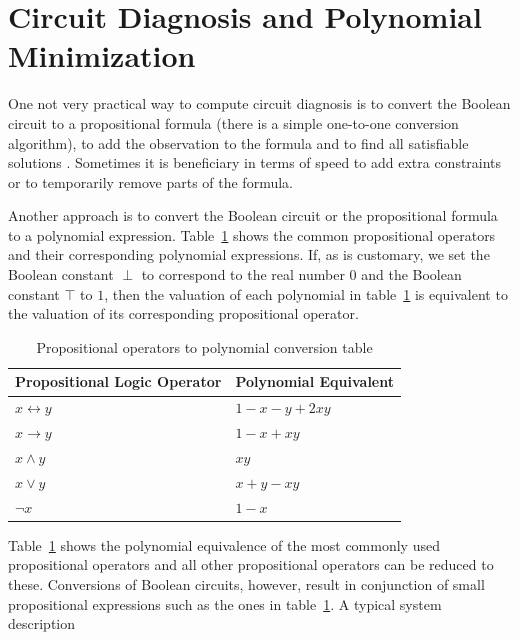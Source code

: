 \documentclass{article}
\begin{document}
\section{Circuit Diagnosis and Polynomial Minimization}
%
One not very practical way to compute circuit diagnosis is to convert
the Boolean circuit to a propositional formula (there is a simple
one-to-one conversion algorithm), to add the observation to the
formula and to find all satisfiable solutions \cite{?}. Sometimes it
is beneficiary in terms of speed to add extra constraints or to
temporarily remove parts of the formula.
\par
Another approach is to convert the Boolean circuit or the
propositional formula to a polynomial
expression. Table~\ref{tbl:polynomial_conversion} shows the common
propositional operators and their corresponding polynomial
expressions. If, as is customary, we set the Boolean constant $\perp$
to correspond to the real number $0$ and the Boolean constant $\top$
to $1$, then the valuation of each polynomial in
table~\ref{tbl:polynomial_conversion} is equivalent to the valuation
of its corresponding propositional operator.
%
\begin{table}[hbt]
\begin{center}
\begin{tabular}{ll}
\toprule
Propositional Logic Operator & Polynomial Equivalent \\
\midrule
$x \leftrightarrow y$        & $1 - x - y + 2xy$     \\
$x \rightarrow y$            & $1 - x + xy$          \\
$x \wedge y$                 & $xy$                  \\
$x \vee y$                   & $x + y - xy$          \\
$\neg{x}$                    & $1 - x$               \\
\bottomrule
\end{tabular}
\caption{Propositional operators to polynomial conversion table\label{tbl:polynomial_conversion}}
\end{center}
\end{table}
\par
Table~\ref{tbl:polynomial_conversion} shows the polynomial equivalence
of the most commonly used propositional operators and all other
propositional operators can be reduced to these. Conversions of
Boolean circuits, however, result in conjunction of small
propositional expressions such as the ones in
table~\ref{tbl:polynomial_conversion}. A typical system description
\end{document}

